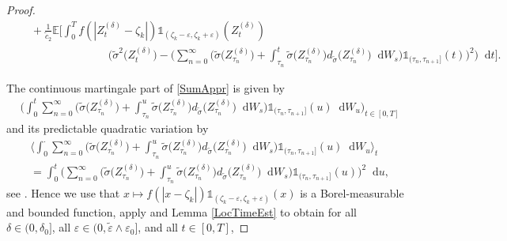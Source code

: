 \documentclass[11pt,a4paper]{article}
\numberwithin{equation}{section}
\theoremstyle{definition}
\newcommand{\E}{{\mathbb{E}}}
\newcommand{\diff}{\mathop{}\!\mathrm{d}}
\begin{document}
\begin{proof}
\begin{equation}
\begin{aligned}
            &\quad +  \frac{1}{\widetilde c_2} \E\Big[\int_0^T f(|Z^{(\delta)}_{t}-\zeta_k|)\mathds{1}_{(\zeta_k-\varepsilon, \zeta_k+\varepsilon)}(Z^{(\delta)}_{t})\\
            &\quad\quad\quad\quad \quad\quad\quad\quad \Big( \widetilde\sigma^2 \big(Z^{(\delta)}_{t}\big) - \Big(\sum_{n=0}^{\infty} \Big( \widetilde\sigma \big(Z^{(\delta)}_{\tau_n}\big) + \int_{\tau_n}^t \widetilde\sigma \big(Z^{(\delta)}_{\tau_n}\big)d_{\widetilde\sigma} \big(Z^{(\delta)}_{\tau_n}\big)\diff W_s \Big)\mathds{1}_{(\tau_n,\tau_{n+1}]}(t) \Big)^2 \Big)\diff t \Big].
        \end{aligned}
    \end{equation}
    
The continuous martingale part of \eqref{SumAppr} is given by
\begin{equation}\label{pOTE20}
    \begin{aligned}
    &\Big(\int_0^t \sum_{n=0}^{\infty} \Big( \widetilde\sigma \big(Z^{(\delta)}_{\tau_n}\big) + \int_{\tau_n}^u \widetilde\sigma \big(Z^{(\delta)}_{\tau_n}\big)d_{\widetilde\sigma} \big(Z^{(\delta)}_{\tau_n}\big)\diff W_s \Big)\mathds{1}_{(\tau_n,\tau_{n+1}]}(u)\diff W_u\Big)_{t\in[0,T]}
    \end{aligned}
\end{equation}
and its predictable quadratic variation by 
\begin{equation}\label{pOTE20a}
    \begin{aligned}
    &\Big\langle \int_0^\cdot \sum_{n=0}^{\infty} \Big( \widetilde\sigma \big(Z^{(\delta)}_{\tau_n}\big) + \int_{\tau_n}^u \widetilde\sigma \big(Z^{(\delta)}_{\tau_n}\big)d_{\widetilde\sigma} \big(Z^{(\delta)}_{\tau_n}\big)\diff W_s \Big)\mathds{1}_{(\tau_n,\tau_{n+1}]}(u)\diff W_u\Big\rangle_t\\
    &= \int_0^t \Big(\sum_{n=0}^{\infty} \Big( \widetilde\sigma \big(Z^{(\delta)}_{\tau_n}\big) + \int_{\tau_n}^u \widetilde\sigma \big(Z^{(\delta)}_{\tau_n}\big)d_{\widetilde\sigma} \big(Z^{(\delta)}_{\tau_n}\big)\diff W_s \Big)\mathds{1}_{(\tau_n,\tau_{n+1}]}(u)\Big)^2\diff u,
    \end{aligned}
\end{equation}
see \cite[Theorem 88]{situ2005}.
Hence we use that $ x\mapsto f(|x-\zeta_k|)\mathds{1}_{(\zeta_k-\varepsilon, \zeta_k+\varepsilon)}(x)$ is a Borel-measurable and bounded function, apply \cite[Lemma 159]{situ2005} and Lemma \ref{LocTimeEst} to obtain for all $\delta\in(0,\delta_0]$, all $\varepsilon \in(0, \widetilde \varepsilon \wedge \varepsilon_0]$, and all $t\in[0,T]$,

\end{proof}
\end{document}
